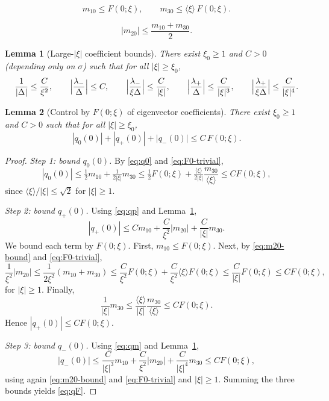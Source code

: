 \documentclass[10pt,a4paper]{amsart}
\newtheorem{lemma}{Lemma}
\newcommand{\ang}[1]{\langle #1\rangle}
\begin{document}
\begin{equation}\label{eq:F0-trivial}
m_{10}\le F(0;\xi),\qquad m_{30}\le \ang{\xi}\,F(0;\xi).
\end{equation}

\begin{equation}\label{eq:m20-bound}
|m_{20}|\le \frac{m_{10}+m_{30}}{2}.
\end{equation}

\begin{lemma}[Large-$|\xi|$ coefficient bounds]\label{lem:coef}
There exist $\xi_0\ge1$ and $C>0$ (depending only on $\sigma$) such that for all $|\xi|\ge\xi_0$,
\begin{equation}\label{eq:coef}
\frac1{|\Delta|}\le\frac{C}{\xi^2},\qquad
\Bigl|\frac{\lambda_-}{\Delta}\Bigr|\le C,\qquad
\Bigl|\frac{\lambda_-}{\xi\Delta}\Bigr|\le\frac{C}{|\xi|},\qquad
\Bigl|\frac{\lambda_+}{\Delta}\Bigr|\le\frac{C}{|\xi|^3},\qquad
\Bigl|\frac{\lambda_+}{\xi\Delta}\Bigr|\le\frac{C}{|\xi|^4}.
\end{equation}
\end{lemma}

\begin{lemma}[Control by $F(0;\xi)$ of eigenvector coefficients]\label{lem:qF}
There exist $\xi_0\ge1$ and $C>0$ such that for all $|\xi|\ge\xi_0$,
\begin{equation}\label{eq:qF}
|q_0(0)|+|q_+(0)|+|q_-(0)|\le C\,F(0;\xi).
\end{equation}
\end{lemma}

\begin{proof}
\emph{Step 1: bound $q_0(0)$.}
By \eqref{eq:q0} and \eqref{eq:F0-trivial},
\[
|q_0(0)|\le \tfrac12 m_{10}+\tfrac1{2|\xi|}m_{30}
\le \tfrac12F(0;\xi)+\tfrac{\ang{\xi}}{2|\xi|}\frac{m_{30}}{\ang{\xi}}
\le C F(0;\xi),
\]
since $\ang{\xi}/|\xi|\le \sqrt{2}$ for $|\xi|\ge 1$.

\medskip
\noindent
\emph{Step 2: bound $q_+(0)$.}
Using \eqref{eq:qp} and Lemma~\ref{lem:coef},
\[
|q_+(0)|\le C m_{10}+\frac{C}{\xi^2}|m_{20}|+\frac{C}{|\xi|}m_{30}.
\]
We bound each term by $F(0;\xi)$. First, $m_{10}\le F(0;\xi)$.
Next, by \eqref{eq:m20-bound} and \eqref{eq:F0-trivial},
\[
\frac{1}{\xi^2}|m_{20}|\le \frac{1}{2\xi^2}(m_{10}+m_{30})
\le \frac{C}{\xi^2}F(0;\xi)+\frac{C}{\xi^2}\ang{\xi}F(0;\xi)
\le \frac{C}{|\xi|}F(0;\xi)\le C F(0;\xi),
\]
for $|\xi|\ge 1$.
Finally,
\[
\frac{1}{|\xi|}m_{30}\le \frac{\ang{\xi}}{|\xi|}\frac{m_{30}}{\ang{\xi}}
\le C F(0;\xi).
\]
Hence $|q_+(0)|\le C F(0;\xi)$.

\medskip
\noindent
\emph{Step 3: bound $q_-(0)$.}
Using \eqref{eq:qm} and Lemma~\ref{lem:coef},
\[
|q_-(0)|\le \frac{C}{|\xi|^3}m_{10}+\frac{C}{\xi^2}|m_{20}|+\frac{C}{|\xi|^4}m_{30}
\le C F(0;\xi),
\]
using again \eqref{eq:m20-bound} and \eqref{eq:F0-trivial} and $|\xi|\ge 1$. Summing the three bounds yields \eqref{eq:qF}.
\end{proof}
\end{document}
